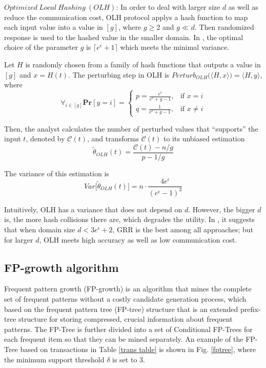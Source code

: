 \documentclass[conference]{IEEEtran}
\begin{document}

$Optimized\ Local\ Hashing\ (OLH)$\cite{a8}: In order to deal with larger size $d$ as well as reduce the communication cost, OLH protocol applys a hash function to map each input value into a value in $[g]$, where $g \geq 2$ and $g \ll d$. Then randomized response is used to the hashed value in the smaller domain. In \cite{a8}, the optimal choice of the parameter $g$ is $\lceil e^{\epsilon}+1 \rceil$ which meets the minimal variance.

Let $H$ is randomly chosen from a family of hash functions that outputs a value in $[g]$ and $x = H(t)$. The perturbing step in OLH is $Perturb_{OLH} \big(\langle H,x \rangle \big) = \langle H,y \rangle$, where
$$\forall_{i\in [g]} \mathbf{Pr} [y=i] = 
\begin{cases}
p = \frac{e^{\epsilon}}{e^{\epsilon}+g-1},&\text{if $x=i$} \\
q = \frac{1}{e^{\epsilon}+g-1},&\text{if $x\neq i$}
\end{cases}
$$

Then, the analyst calculates the number of perturbed values that ``supports'' the input $t$, denoted by $\mathcal{C}(t)$, and transforms $\mathcal{C}(t)$ to its unbiased estimation
\begin{equation}
\tilde{\theta}_{OLH}(t) = \frac{\mathcal{C}(t) - n/g}{p-1/g}
\label{olh aggregate}
\end{equation}

The variance of this estimation is 
\begin{equation}
Var\big[\tilde{\theta}_{OLH}(t)\big] =n \cdot \frac{4e^{\epsilon}}{{(e^{\epsilon}-1)}^2}
\label{olh variance}
\end{equation}

Intuitively, OLH has a variance that does not depend on $d$. However, the bigger $d$ is, the more hash collisions there are, which degrades the utility. In \cite{a8}, it suggests that when domain size $d<3e^{\epsilon} +2$, GRR is the best among all approaches; but for larger $d$, OLH meets high accuracy as well as low communication cost.

\subsection{FP-growth algorithm}
Frequent pattern growth (FP-growth)\cite{fp} is an algorithm that mines the complete set of frequent patterns without a costly candidate generation process, which based on the frequent pattern tree (FP-tree) structure that is an extended prefix-tree structure for storing compressed, crucial information about frequent patterns. The FP-Tree is further divided into a set of Conditional FP-Trees for each frequent item so that they can be mined separately. An example of the FP-Tree based on transactions in Table \ref{trans table} is shown in Fig. \ref{fptree}, where the minimum support threshold $\delta$ is set to 3.
\end{document}
